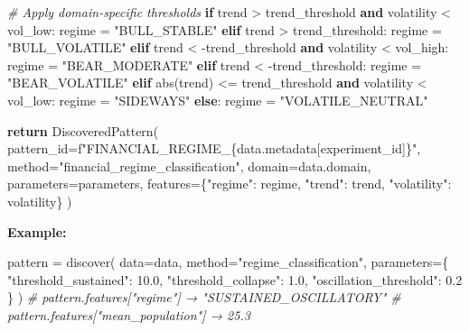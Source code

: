 \documentclass[
]{article}
\newenvironment{Shaded}{}{}
\newcommand{\BuiltInTok}[1]{\textcolor[rgb]{0.00,0.50,0.00}{#1}}
\newcommand{\CommentTok}[1]{\textcolor[rgb]{0.38,0.63,0.69}{\textit{#1}}}
\newcommand{\ControlFlowTok}[1]{\textcolor[rgb]{0.00,0.44,0.13}{\textbf{#1}}}
\newcommand{\FloatTok}[1]{\textcolor[rgb]{0.25,0.63,0.44}{#1}}
\newcommand{\KeywordTok}[1]{\textcolor[rgb]{0.00,0.44,0.13}{\textbf{#1}}}
\newcommand{\NormalTok}[1]{#1}
\newcommand{\OperatorTok}[1]{\textcolor[rgb]{0.40,0.40,0.40}{#1}}
\newcommand{\SpecialCharTok}[1]{\textcolor[rgb]{0.25,0.44,0.63}{#1}}
\newcommand{\SpecialStringTok}[1]{\textcolor[rgb]{0.73,0.40,0.53}{#1}}
\newcommand{\StringTok}[1]{\textcolor[rgb]{0.25,0.44,0.63}{#1}}
\begin{document}
\begin{Shaded}
\begin{Highlighting}[]
    \CommentTok{\# Apply domain{-}specific thresholds}
    \ControlFlowTok{if}\NormalTok{ trend }\OperatorTok{\textgreater{}}\NormalTok{ trend\_threshold }\KeywordTok{and}\NormalTok{ volatility }\OperatorTok{\textless{}}\NormalTok{ vol\_low:}
\NormalTok{        regime }\OperatorTok{=} \StringTok{"BULL\_STABLE"}
    \ControlFlowTok{elif}\NormalTok{ trend }\OperatorTok{\textgreater{}}\NormalTok{ trend\_threshold:}
\NormalTok{        regime }\OperatorTok{=} \StringTok{"BULL\_VOLATILE"}
    \ControlFlowTok{elif}\NormalTok{ trend }\OperatorTok{\textless{}} \OperatorTok{{-}}\NormalTok{trend\_threshold }\KeywordTok{and}\NormalTok{ volatility }\OperatorTok{\textless{}}\NormalTok{ vol\_high:}
\NormalTok{        regime }\OperatorTok{=} \StringTok{"BEAR\_MODERATE"}
    \ControlFlowTok{elif}\NormalTok{ trend }\OperatorTok{\textless{}} \OperatorTok{{-}}\NormalTok{trend\_threshold:}
\NormalTok{        regime }\OperatorTok{=} \StringTok{"BEAR\_VOLATILE"}
    \ControlFlowTok{elif} \BuiltInTok{abs}\NormalTok{(trend) }\OperatorTok{\textless{}=}\NormalTok{ trend\_threshold }\KeywordTok{and}\NormalTok{ volatility }\OperatorTok{\textless{}}\NormalTok{ vol\_low:}
\NormalTok{        regime }\OperatorTok{=} \StringTok{"SIDEWAYS"}
    \ControlFlowTok{else}\NormalTok{:}
\NormalTok{        regime }\OperatorTok{=} \StringTok{"VOLATILE\_NEUTRAL"}

    \ControlFlowTok{return}\NormalTok{ DiscoveredPattern(}
\NormalTok{        pattern\_id}\OperatorTok{=}\SpecialStringTok{f"FINANCIAL\_REGIME\_}\SpecialCharTok{\{}\NormalTok{data}\SpecialCharTok{.}\NormalTok{metadata[}\StringTok{\textquotesingle{}experiment\_id\textquotesingle{}}\NormalTok{]}\SpecialCharTok{\}}\SpecialStringTok{"}\NormalTok{,}
\NormalTok{        method}\OperatorTok{=}\StringTok{"financial\_regime\_classification"}\NormalTok{,}
\NormalTok{        domain}\OperatorTok{=}\NormalTok{data.domain,}
\NormalTok{        parameters}\OperatorTok{=}\NormalTok{parameters,}
\NormalTok{        features}\OperatorTok{=}\NormalTok{\{}\StringTok{"regime"}\NormalTok{: regime, }\StringTok{"trend"}\NormalTok{: trend, }\StringTok{"volatility"}\NormalTok{: volatility\}}
\NormalTok{    )}
\end{Highlighting}
\end{Shaded}

\textbf{Example:}

\begin{Shaded}
\begin{Highlighting}[]
\NormalTok{pattern }\OperatorTok{=}\NormalTok{ discover(}
\NormalTok{    data}\OperatorTok{=}\NormalTok{data,}
\NormalTok{    method}\OperatorTok{=}\StringTok{"regime\_classification"}\NormalTok{,}
\NormalTok{    parameters}\OperatorTok{=}\NormalTok{\{}
        \StringTok{"threshold\_sustained"}\NormalTok{: }\FloatTok{10.0}\NormalTok{,}
        \StringTok{"threshold\_collapse"}\NormalTok{: }\FloatTok{1.0}\NormalTok{,}
        \StringTok{"oscillation\_threshold"}\NormalTok{: }\FloatTok{0.2}
\NormalTok{    \}}
\NormalTok{)}
\CommentTok{\# pattern.features["regime"] → "SUSTAINED\_OSCILLATORY"}
\CommentTok{\# pattern.features["mean\_population"] → 25.3}
\end{Highlighting}
\end{Shaded}
\end{document}
